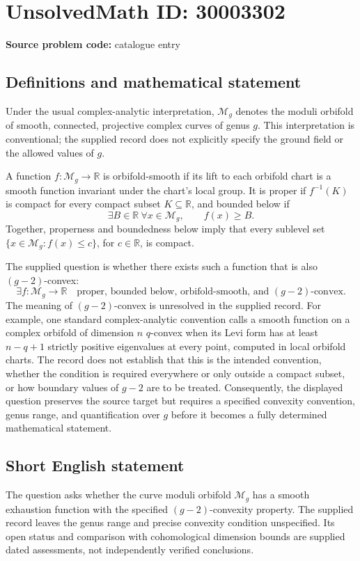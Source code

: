 \documentclass[11pt]{article}
\newcommand{\R}{\mathbb{R}}
\begin{document}
\section*{UnsolvedMath ID: 30003302}
\textbf{Source problem code:} catalogue entry
\subsection{Definitions and mathematical statement}
Under the usual complex-analytic interpretation, \(\mathcal M_g\) denotes the moduli orbifold of smooth, connected, projective complex curves of genus \(g\). This interpretation is conventional; the supplied record does not explicitly specify the ground field or the allowed values of \(g\).

A function \(f:\mathcal M_g\to\R\) is orbifold-smooth if its lift to each orbifold chart is a smooth function invariant under the chart's local group. It is proper if \(f^{-1}(K)\) is compact for every compact subset \(K\subseteq\R\), and bounded below if
\[
\exists B\in\R\ \forall x\in\mathcal M_g,\qquad f(x)\ge B.
\]
Together, properness and boundedness below imply that every sublevel set \(\{x\in\mathcal M_g:f(x)\le c\}\), for \(c\in\R\), is compact.

The supplied question is whether there exists such a function that is also \((g-2)\)-convex:
\[
\exists f:\mathcal M_g\longrightarrow\R\quad
\text{proper, bounded below, orbifold-smooth, and \((g-2)\)-convex}.
\]
The meaning of \((g-2)\)-convex is unresolved in the supplied record. For example, one standard complex-analytic convention calls a smooth function on a complex orbifold of dimension \(n\) \(q\)-convex when its Levi form has at least \(n-q+1\) strictly positive eigenvalues at every point, computed in local orbifold charts. The record does not establish that this is the intended convention, whether the condition is required everywhere or only outside a compact subset, or how boundary values of \(g-2\) are to be treated. Consequently, the displayed question preserves the source target but requires a specified convexity convention, genus range, and quantification over \(g\) before it becomes a fully determined mathematical statement.
\subsection{Short English statement}
The question asks whether the curve moduli orbifold \(\mathcal M_g\) has a smooth exhaustion function with the specified \((g-2)\)-convexity property. The supplied record leaves the genus range and precise convexity condition unspecified. Its open status and comparison with cohomological dimension bounds are supplied dated assessments, not independently verified conclusions.
\end{document}
